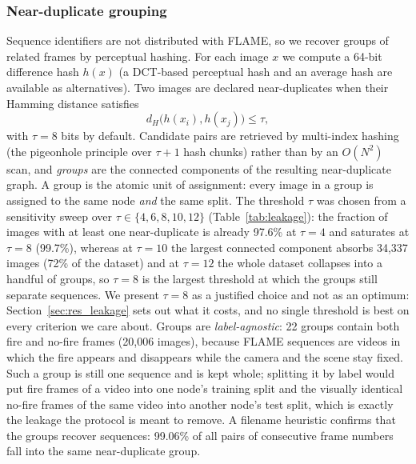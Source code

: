 \documentclass[journal]{IEEEtran}
\begin{document}
\subsubsection{Near-duplicate grouping}
Sequence identifiers are not distributed with FLAME, so we recover groups of related frames by perceptual hashing. For each image $x$ we compute a 64-bit difference hash $h(x)$ (a DCT-based perceptual hash and an average hash are available as alternatives). Two images are declared near-duplicates when their Hamming distance satisfies
\begin{equation}
d_H\bigl(h(x_i), h(x_j)\bigr) \le \tau ,
\label{eq:hamming}
\end{equation}
with $\tau = 8$ bits by default. Candidate pairs are retrieved by multi-index hashing (the pigeonhole principle over $\tau+1$ hash chunks) rather than by an $O(N^2)$ scan, and \emph{groups} are the connected components of the resulting near-duplicate graph. A group is the atomic unit of assignment: every image in a group is assigned to the same node \emph{and} the same split. The threshold $\tau$ was chosen from a sensitivity sweep over $\tau \in \{4, 6, 8, 10, 12\}$ (Table~\ref{tab:leakage}): the fraction of images with at least one near-duplicate is already 97.6\% at $\tau=4$ and saturates at $\tau=8$ (99.7\%), whereas at $\tau=10$ the largest connected component absorbs 34{,}337 images (72\% of the dataset) and at $\tau=12$ the whole dataset collapses into a handful of groups, so $\tau=8$ is the largest threshold at which the groups still separate sequences. We present $\tau=8$ as a justified choice and not as an optimum: Section~\ref{sec:res_leakage} sets out what it costs, and no single threshold is best on every criterion we care about. Groups are \emph{label-agnostic}: 22 groups contain both fire and no-fire frames (20{,}006 images), because FLAME sequences are videos in which the fire appears and disappears while the camera and the scene stay fixed. Such a group is still one sequence and is kept whole; splitting it by label would put fire frames of a video into one node's training split and the visually identical no-fire frames of the same video into another node's test split, which is exactly the leakage the protocol is meant to remove. A filename heuristic confirms that the groups recover sequences: 99.06\% of all pairs of consecutive frame numbers fall into the same near-duplicate group.
\end{document}
